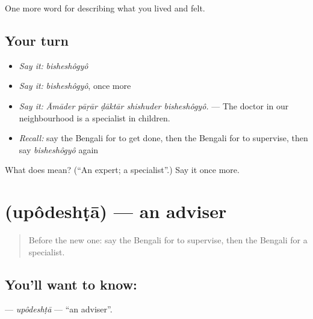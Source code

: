\begin{grammarlens}[title={What you've built}]
One more word for describing what you lived and felt.
\end{grammarlens}

\subsection*{Your turn}
\begin{itemize}
\raggedright
  \item \emph{Say it:} \emph{bisheshôgyô}
  \item \emph{Say it:} \emph{bisheshôgyô}, once more
  \item \emph{Say it:} \emph{Āmāder pāṛār ḍāktār shishuder bisheshôgyô.} — The doctor in our neighbourhood is a specialist in children.
  \item \emph{Recall:} say the Bengali for to get done, then the Bengali for to supervise, then say \emph{bisheshôgyô} again
\end{itemize}

\begin{tcolorbox}[breakable,colback=teal!4,colframe=teal!35!black,title={Before you move on}]
What does  mean? (\textquotedblleft{}An expert; a specialist\textquotedblright{}.) Say it once more.
\end{tcolorbox}
\section[\texorpdfstring{\bn{উপদেষ্টা} (upôdeshṭā)}{উপদেষ্টা (upôdeshṭā)}]{ (upôdeshṭā) — an adviser}

\label{lesson:BN-C501-upodeshta}



\begin{quote}
Before the new one: say the Bengali for to supervise, then the Bengali for a specialist.
\end{quote}

\subsection*{You'll want to know: }
\textbf{} — \emph{upôdeshṭā} — \textquotedblleft{}an adviser\textquotedblright{}.

\begin{quote}
       
\end{quote}

